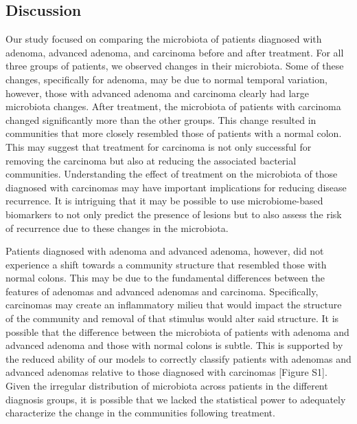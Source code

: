 \documentclass[12pt,]{article}
\begin{document}
\newpage

\subsection{Discussion}\label{discussion}

Our study focused on comparing the microbiota of patients diagnosed with
adenoma, advanced adenoma, and carcinoma before and after treatment. For
all three groups of patients, we observed changes in their microbiota.
Some of these changes, specifically for adenoma, may be due to normal
temporal variation, however, those with advanced adenoma and carcinoma
clearly had large microbiota changes. After treatment, the microbiota of
patients with carcinoma changed significantly more than the other
groups. This change resulted in communities that more closely resembled
those of patients with a normal colon. This may suggest that treatment
for carcinoma is not only successful for removing the carcinoma but also
at reducing the associated bacterial communities. Understanding the
effect of treatment on the microbiota of those diagnosed with carcinomas
may have important implications for reducing disease recurrence. It is
intriguing that it may be possible to use microbiome-based biomarkers to
not only predict the presence of lesions but to also assess the risk of
recurrence due to these changes in the microbiota.

Patients diagnosed with adenoma and advanced adenoma, however, did not
experience a shift towards a community structure that resembled those
with normal colons. This may be due to the fundamental differences
between the features of adenomas and advanced adenomas and carcinoma.
Specifically, carcinomas may create an inflammatory milieu that would
impact the structure of the community and removal of that stimulus would
alter said structure. It is possible that the difference between the
microbiota of patients with adenoma and advanced adenoma and those with
normal colons is subtle. This is supported by the reduced ability of our
models to correctly classify patients with adenomas and advanced
adenomas relative to those diagnosed with carcinomas {[}Figure S1{]}.
Given the irregular distribution of microbiota across patients in the
different diagnosis groups, it is possible that we lacked the
statistical power to adequately characterize the change in the
communities following treatment.
\end{document}
